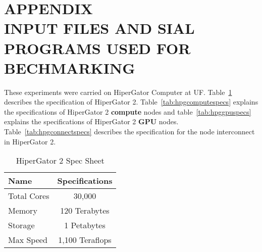 


\appendix %

\chapter*{APPENDIX \\ INPUT FILES AND SIAL PROGRAMS USED FOR BECHMARKING} %


\setcounter{chapter}{1} %
These experiments were carried on HiperGator Computer at UF. Table~\ref{tab:hpg2spec}
describes the specification of HiperGator 2. Table~\ref{tab:hpgcomputespecs}
explains the specifications of HiperGator 2 \textbf{compute} nodes and
table~\ref{tab:hpggpuspecs} explains the specifications of HiperGator 2 \textbf{GPU}
nodes. Table~\ref{tab:hpgconnectspecs} describes the specification for the
node interconnect in HiperGator 2.

\begin{table}[h]
  \centering
  \caption{HiperGator 2 Spec Sheet}
  \begin{tabular}{l c}
    \hline
    Name        & Specifications  \\
    \hline
    Total Cores & 30,000          \\
    Memory      & 120 Terabytes   \\
    Storage     & 1 Petabytes     \\
    Max Speed   & 1,100 Teraflops \\
    \hline
  \end{tabular}
  \label{tab:hpg2spec}
\end{table}

